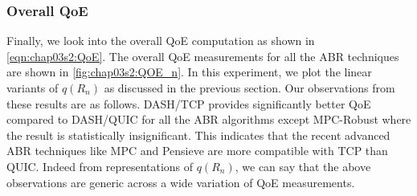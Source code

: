 \subsubsection{Overall QoE}
Finally, we look into the overall QoE computation as shown in \eqn\ref{eqn:chap03s2:QoE}. The overall QoE measurements for  all the ABR techniques are shown in \fig\ref{fig:chap03s2:QOE_n}. In this experiment, we plot the linear variants of $q(R_n)$ as discussed in the previous section. Our observations from these results are as follows. DASH/TCP provides significantly better QoE compared to DASH/QUIC for all the ABR algorithms except MPC-Robust where the result is statistically insignificant. This indicates that the recent advanced ABR techniques like MPC and Pensieve are more compatible with TCP than QUIC. Indeed from representations of $q(R_n)$, we can say that the above observations are generic across a wide variation of QoE measurements. 


